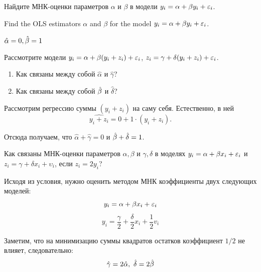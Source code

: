 \begin{problem}
\begin{translationru}
    Найдите МНК-оценки параметров $\alpha$ и $\beta$ в модели $y_i = \alpha + \beta y_i + \varepsilon_i$.    
\end{translationru}
\begin{translationen}
    Find the OLS estimators $\alpha$ and $\beta$ for the model $y_i = \alpha + \beta y_i + \varepsilon_i$.    
\end{translationen}

\begin{sol}
$\hat{\alpha} = 0,  \hat{\beta} = 1$
\end{sol}
\end{problem}


\begin{problem}
Рассмотрите модели $y_i = \alpha + \beta (y_i + z_i) + \varepsilon_i$, $z_i = \gamma + \delta(y_i+z_i) + \varepsilon_i$.
\begin{enumerate}
\item Как связаны между собой $\hat{\alpha}$ и $\hat{\gamma}$?
\item Как связаны между собой $\hat{\beta}$ и $\hat{\delta}$?
\end{enumerate}


\begin{sol} %
Рассмотрим регрессию суммы $(y_i + z_i)$ на саму себя. Естественно, в ней
\[
\widehat{y_i + z_i} = 0 + 1 \cdot (y_i + z_i).
\]

Отсюда получаем, что $\hat{\alpha} + \hat{\gamma} = 0$ и $\hat{\beta} + \hat{\delta} = 1$.
\end{sol}
\end{problem}




\begin{problem}
Как связаны МНК-оценки параметров $\alpha, \beta$ и $\gamma, \delta$ в моделях $y_i = \alpha + \beta x_i + \varepsilon_i$ и $z_i = \gamma + \delta x_i + \upsilon_i$, если $z_i = 2 y_i$?


\begin{sol}

Исходя из условия, нужно оценить методом МНК коэффициенты двух следующих моделей:
\[y_i = \alpha + \beta x_i + \varepsilon_i \]
\[y_i = \frac{\gamma}{2} + \frac{\delta}{2} x_i + \frac{1}{2} v_i \]

Заметим, что на минимизацию суммы квадратов остатков коэффициент \(1/2\) не влияет, следовательно:
\[\hat{\gamma} = 2\hat{\alpha}, \ \hat{\delta} = 2 \hat{\beta}  \]

\end{sol}
\end{problem}


